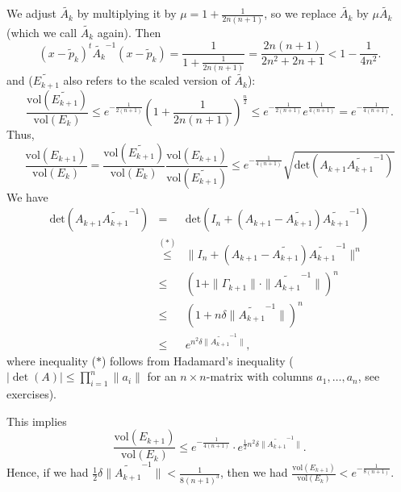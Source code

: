 \documentclass[12pt, showidx, twoside]{article}
\begin{document}
{{{We adjust $\tilde {A_k}$ by multiplying it by $\mu = 1 + \frac{1}{2n(n+1)}$,
so we replace $\tilde{A_k}$ by $\mu \tilde{A_k}$ 
(which we call $\tilde{A_k}$ again).
Then
\begin{equation}
(x - \tilde p_k)^t \tilde{A_k}^{-1} (x - \tilde p_k) 
 = \frac{1}{1 + \frac{1}{2n(n+1)}} = \frac{2n(n+1)}{2n^2 + 2n + 1} < 1 - \frac{1}{4n^2}.
\end{equation}
and ($\widetilde{E_{k+1}}$ also refers to the scaled version of $\tilde{A_{k}}$):
\begin{equation}
   \frac{\text{vol}(\widetilde{E_{k+1}})}{\text{vol}(E_k)} 
        \leq e^{-\frac{1}{2(n+1)}} \left(1 + \frac{1}{2n(n+1)}\right)^\frac{n}{2}
        \leq e^{-\frac{1}{2(n+1)}} e^{\frac{1}{4(n+1)}}
          =  e^{-\frac{1}{4(n+1)}}.
\end{equation}
Thus,
\begin{equation}
   \frac{\text{vol}({E_{k+1}})}{\text{vol}(E_k)} 
   = \frac{\text{vol}(\widetilde{E_{k+1}})}{\text{vol}(E_k)} \frac{\text{vol}({E_{k+1}})}{\text{vol}(\widetilde{E_{k+1}})} 
   \leq  e^{-\frac{1}{4(n+1)}} \sqrt{\text{det}(A_{k+1} \widetilde{A_{k+1}}^{-1} )}
\end{equation}
We have
\begin{equation*}
  \begin{array}{rcl}
   \text{det}(A_{k+1} \widetilde{A_{k+1}}^{-1} ) 
        & = & \text{det}\left(I_n + ( A_{k+1} - \widetilde{A_{k+1}} ) \widetilde{A_{k+1}}^{-1}\right) \\
        & \stackrel{(*)}{\leq} & \|I_n + ( A_{k+1} - \widetilde{A_{k+1}} ) \widetilde{A_{k+1}}^{-1}\|^n \\
        & \leq & (1 + \|\Gamma_{k+1}\|\cdot \|\widetilde{A_{k+1}}^{-1}\|)^n \\
        & \leq & (1 + n \delta \|\widetilde{A_{k+1}}^{-1}\|)^n \\
        & \leq & e^{n^2 \delta \|\widetilde{A_{k+1}}^{-1}\|},
  \end{array}
\end{equation*}
where inequality ($*$) follows from Hadamard's inequality 
($|\det(A)| \leq \prod_{i=1}^n \|a_i\|$ for an $n\times n$-matrix with 
columns $a_1,\dots,a_n$, see exercises).

This implies 
\[
   \frac{\text{vol}({E_{k+1}})}{\text{vol}(E_k)} \leq e^{-\frac{1}{4(n+1)}} \cdot e^{\frac{1}{2} n^2 \delta \|\widetilde{A_{k+1}}^{-1}\|}.
\]
Hence, if we had $\frac{1}{2}\delta \|\widetilde{A_{k+1}}^{-1}\| < \frac{1}{8(n+1)^3}$, then
we had $\frac{\text{vol}({E_{k+1}})}{\text{vol}(E_k)} < e^{-\frac{1}{8(n+1)}}$.

}}}
\end{document}
